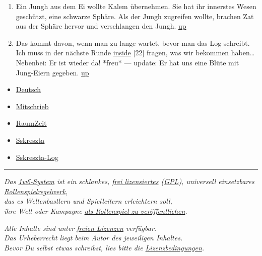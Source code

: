 \documentclass[11pt]{scrartcl}
\begin{document}
\begin{enumerate}
\item
  Ein Jungh aus dem Ei wollte Kalem übernehmen. Sie hat ihr innerstes
  Wesen geschützt, eine schwarze Sphäre. Als der Jungh zugreifen wollte,
  brachen Zat aus der Sphäre hervor und verschlangen den Jungh.
  \href{http://1w6.org/print/book/export/html/59\#fnref:kalem-innen}{up}
\item
  Das kommt davon, wenn man zu lange wartet, bevor man das Log schreibt.
  Ich muss in der nächste Runde
  \href{http://1w6.org/uzanto/inside}{inside} {[}22{]} fragen, was wir
  bekommen haben\ldots{} Nebenbei: Er ist wieder da! *freu* --- update:
  Er hat uns eine Blüte mit Jung-Eiern gegeben.
  \href{http://1w6.org/print/book/export/html/59\#fnref:1}{up}
\end{enumerate}
\begin{itemize}
\item
  \href{http://1w6.org/stichwort/deutsch}{Deutsch}
\item
  \href{http://1w6.org/stichwort/mitschrieb}{Mitschrieb}
\item
  \href{http://1w6.org/stichwort/raumzeit}{RaumZeit}
\item
  \href{http://1w6.org/stichwort/sskreszta}{Sskreszta}
\item
  \href{http://1w6.org/stichwort/sskreszta-log}{Sskreszta-Log}
\end{itemize}
\begin{center}\rule{3in}{0.4pt}\end{center}

\emph{Das \href{http://1w6.org/deutsch/regeln/}{1w6-System} ist ein schlankes,
\href{http://1w6.org/deutsch/anhang/das-ein-w-rfel-system-jetzt-unter-der-gplv3}{frei
lizensiertes} (\href{http://lizenz.1w6.org}{GPL}), universell einsetzbares
\href{http://de.wikipedia.org/wiki/Pen-\&-Paper-Rollenspiel\#Regelsysteme}{Rollenspielregelwerk},
\\ das es Weltenbastlern und Spielleitern erleichtern soll, \\ ihre
Welt oder Kampagne
\href{http://1w6.org/deutsch/regeln/das-ews-deine-beduerfnisse-anpassen/deine-welt-als-rollenspiel-veroeffentlichen}{als
Rollenspiel zu veröffentlichen}.}

\emph{Alle Inhalte sind unter \href{http://lizenz.1w6.org}{freien
Lizenzen} verfügbar. \\ Das Urheberrecht liegt beim Autor des
jeweiligen Inhaltes. \\ Bevor Du selbst etwas schreibst, lies bitte die
\href{http://lizenz.1w6.org}{Lizenzbedingungen}.}
\end{document}
